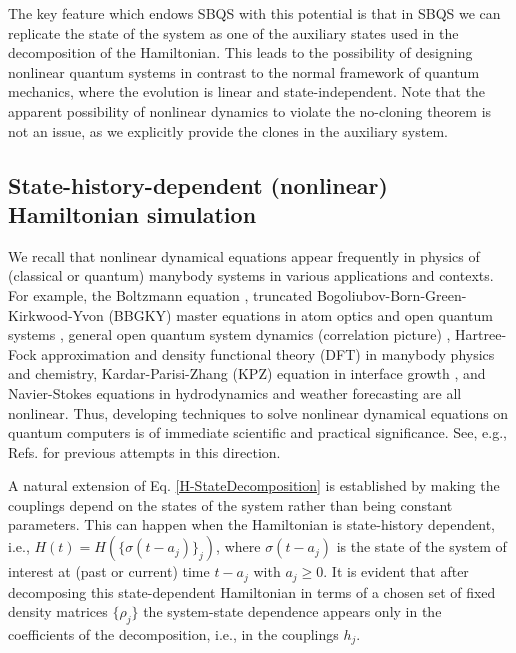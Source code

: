 \documentclass[aps,pra,twocolumn,floatfix,groupedaddress,superscriptaddress,nofootinbib,notitlepage]{revtex4-2}
\begin{document}
The key feature which endows SBQS with this potential is that in SBQS we can replicate the state of the system as one of the auxiliary states used in the decomposition of the Hamiltonian. This leads to the possibility of designing nonlinear quantum systems in contrast to the normal framework of quantum mechanics, where the evolution is linear and state-independent. Note that the apparent possibility of nonlinear dynamics to violate the no-cloning theorem is not an issue, as we explicitly provide the clones in the auxiliary system.  

\subsection{State-history-dependent (nonlinear) Hamiltonian simulation}
\label{sec:nonlinear}

We recall that nonlinear dynamical equations appear frequently in physics of (classical or quantum) manybody systems in various applications and contexts. For example, the Boltzmann equation \cite{book:Huang}, truncated Bogoliubov-Born-Green-Kirkwood-Yvon (BBGKY) master equations in atom optics and open quantum systems \cite{Meystre-NL, Molmer-NL, Los-NL, Rev-NL}, general open quantum system dynamics (correlation picture) \cite{CorrPic}, Hartree-Fock approximation \cite{Hartree-NL} and density functional theory (DFT) \cite{DFT-NL} in manybody physics and chemistry, Kardar-Parisi-Zhang (KPZ) equation in interface growth \cite{KPZ-NL}, and Navier-Stokes equations in hydrodynamics and weather forecasting \cite{NS-NL} are all nonlinear. Thus, developing techniques to solve nonlinear dynamical equations on quantum computers is of immediate scientific and practical significance. See, e.g., Refs. \cite{Osborne-MultCop, Lloyd-Marvian-nonlinear-Diff, Childs-1, Childs-dissipative-NL, Krovi, Fujii, new-scaling, Umer-etal} for previous attempts in this direction.

A natural extension of Eq. \eqref{H-StateDecomposition} is established by making the couplings depend on the states of the system rather than being constant parameters. This can happen when the Hamiltonian is state-history dependent, i.e., $H(t)=H(\{\sigma(t-a_{j})\}_j)$, where $\sigma(t-a_{j})$ is the state of the system of interest at (past or current) time $t-a_{j}$ with $a_{j}\geqslant 0$. It is evident that after decomposing this state-dependent Hamiltonian in terms of a chosen set of fixed density matrices $\{\rho_j\}$ the system-state dependence appears only in the coefficients of the decomposition, i.e., in the couplings $h_j$.
\end{document}
